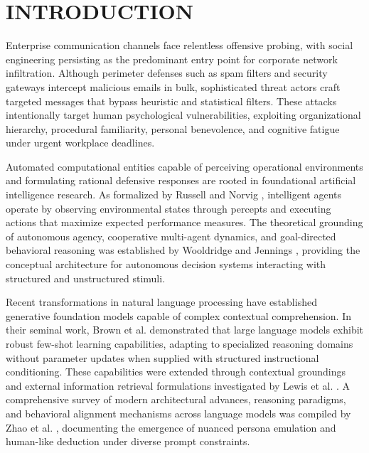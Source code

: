 \documentclass[conference,letterpaper]{IEEEtran}
\begin{document}
\section{INTRODUCTION}
Enterprise communication channels face relentless offensive probing, with social engineering persisting as the predominant entry point for corporate network infiltration. Although perimeter defenses such as spam filters and security gateways intercept malicious emails in bulk, sophisticated threat actors craft targeted messages that bypass heuristic and statistical filters. These attacks intentionally target human psychological vulnerabilities, exploiting organizational hierarchy, procedural familiarity, personal benevolence, and cognitive fatigue under urgent workplace deadlines.

Automated computational entities capable of perceiving operational environments and formulating rational defensive responses are rooted in foundational artificial intelligence research. As formalized by Russell and Norvig \cite{russell2021}, intelligent agents operate by observing environmental states through percepts and executing actions that maximize expected performance measures. The theoretical grounding of autonomous agency, cooperative multi-agent dynamics, and goal-directed behavioral reasoning was established by Wooldridge and Jennings \cite{wooldridge1995}, providing the conceptual architecture for autonomous decision systems interacting with structured and unstructured stimuli.

Recent transformations in natural language processing have established generative foundation models capable of complex contextual comprehension. In their seminal work, Brown et al. \cite{brown2020} demonstrated that large language models exhibit robust few-shot learning capabilities, adapting to specialized reasoning domains without parameter updates when supplied with structured instructional conditioning. These capabilities were extended through contextual groundings and external information retrieval formulations investigated by Lewis et al. \cite{lewis2020}. A comprehensive survey of modern architectural advances, reasoning paradigms, and behavioral alignment mechanisms across language models was compiled by Zhao et al. \cite{zhao2023}, documenting the emergence of nuanced persona emulation and human-like deduction under diverse prompt constraints.
\end{document}
